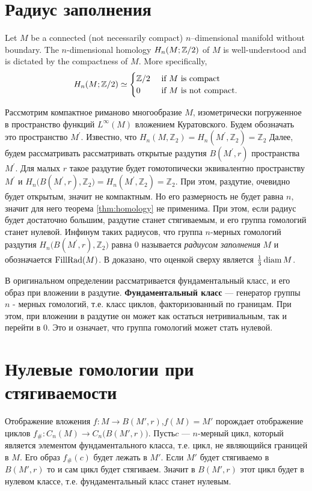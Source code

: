 \documentclass[11pt,twoside
]{article}
\begin{document}
\section{Радиус заполнения}
\begin{theorem}
  \label{thm:homology}
  Let $M$ be a connected (not necessarily compact) $n$--dimensional
  manifold without boundary.
  The $n$-dimensional homology $H_n(M;{\mathbb Z}/2)$ of $M$ is
  well-understood and is dictated by the compactness of $M$.
  More specifically,
  \begin{equation}\label{eq:fund-cls}
    H_n(M;{\mathbb Z}/2)\simeq
    \begin{cases}
      {\mathbb Z}/2&\text{ if }M\text{ is compact} \\
      0&\text{ if }M\text{ is not compact}.
    \end{cases}
  \end{equation}
\end{theorem}
Рассмотрим компактное риманово многообразие $M$, изометрически
погруженное в пространство функций $L^{\infty}(M)$ вложением
Куратовского. Будем обозначать это пространство $M ^{\prime}$.
Известно, что $H_{n}(M,\mathbb{Z}_{2})= H_{n}(M ^{\prime},
\mathbb{Z}_{2})= \mathbb{Z}_2$ Далее, будем рассматривать
рассматривать открытые раздутия $B(M ^{\prime}, r)$ пространства $M
^{\prime}$. Для малых $r$ такое раздутие будет гомотопически
эквивалентно пространству $M ^{\prime}$ и $H_{n}\big(B(M
^{\prime},r), \mathbb{Z}_{2}\big) = H_{n}(M ^{\prime},
\mathbb{Z}_{2})= \mathbb{Z}_2$. При этом, раздутие, очевидно будет
открытым, значит не компактным. Но его размерность не будет равна \(
n \), значит
для него теорема \ref{thm:homology} не применима. При этом, если
радиус будет достаточно большим, раздутие станет стягиваемым, и его
группа гомологий станет нулевой. Инфинум таких радиусов, что группа
\( n \)-мерных гомологий раздутия \( H_{n}\big(B(M
^{\prime},r), \mathbb{Z}_{2}\big) \) равна \( 0 \) называется
\emph{радиусом заполнения} \( M \) и обозначается \( \operatorname{FillRad}(M)\). В
\cite{katz1983filling} доказано,
что оценкой сверху является \( \frac 1 3 \operatorname{diam} M \).

В оригинальном определении рассматривается фундаментальный класс, и
его образ при вложении в раздутие. \textbf{Фундаментальный класс} ---
генератор группы \( n \) - мерных гомологий, т.е. класс циклов,
факторизованный по границам. При этом, при вложении в раздутие он
может как остаться нетривиальным, так и перейти в \( 0 \). Это и
означает, что группа гомологий может стать нулевой.
\section{Нулевые гомологии при стягиваемости}
Отображение вложения \( f \colon M \rightarrow B(M',r) \),\( f(M) =
M' \) порождает
отображение циклов \( f_{\#} \colon C_n (M) \rightarrow C_n
\big(B(M',r)\big) \). Пусть\( c \) --- \( n \)-мерный цикл, который
является элементом фундаментального класса, т.е. цикл, не являющийся
границей в \( M \). Его образ \( f_\#(c) \) будет лежать в \( M' \).
Если \( M' \) будет стягиваемо в \( B(M',r) \) то и сам цикл будет
стягиваем. Значит в \( B(M',r) \) этот цикл будет в нулевом классе,
т.е. фундаментальный класс станет нулевым.
\end{document}

